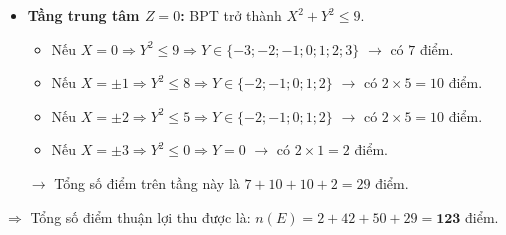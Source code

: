 \begin{ex}
{\begin{itemize}
\begin{itemize}
			\end{itemize}
			$\rightarrow$ Tổng số điểm trên một tầng là $5 + 10 + 10 = 25$ điểm. Tổng $2$ tầng: $25 \times 2 = 50$ điểm.
			\item \textbf{Tầng trung tâm $Z = 0$:} BPT trở thành $X^2 + Y^2 \le 9$.
			\begin{itemize}
				\item Nếu $X = 0 \Rightarrow Y^2 \le 9 \Rightarrow Y \in \{-3; -2; -1; 0; 1; 2; 3\}$ $\rightarrow$ có $7$ điểm.
				\item Nếu $X = \pm 1 \Rightarrow Y^2 \le 8 \Rightarrow Y \in \{-2; -1; 0; 1; 2\}$ $\rightarrow$ có $2 \times 5 = 10$ điểm.
				\item Nếu $X = \pm 2 \Rightarrow Y^2 \le 5 \Rightarrow Y \in \{-2; -1; 0; 1; 2\}$ $\rightarrow$ có $2 \times 5 = 10$ điểm.
				\item Nếu $X = \pm 3 \Rightarrow Y^2 \le 0 \Rightarrow Y = 0$ $\rightarrow$ có $2 \times 1 = 2$ điểm.
			\end{itemize}
			$\rightarrow$ Tổng số điểm trên tầng này là $7 + 10 + 10 + 2 = 29$ điểm.
		\end{itemize}
		$\Rightarrow$ Tổng số điểm thuận lợi thu được là: $n(E) = 2 + 42 + 50 + 29 = \mathbf{123}$ điểm.
		
}
\end{ex}
